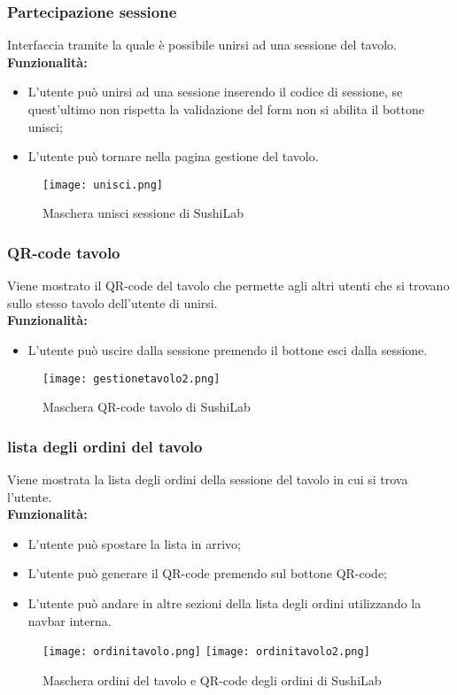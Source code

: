 \subsubsection{Partecipazione sessione}
Interfaccia tramite la quale è possibile unirsi ad una sessione del tavolo.\\
\textbf{Funzionalità:}
\begin{itemize}
    \item L'utente può unirsi ad una sessione inserendo il codice di sessione, se quest'ultimo non rispetta la validazione del form non si abilita il bottone unisci;
    \item L'utente può tornare nella pagina gestione del tavolo.
\end{itemize}
\begin{figure}[H]
    \centering
    \texttt{[image: unisci.png]}
    \caption{Maschera unisci sessione di SushiLab}
\end{figure}
\pagebreak

\subsubsection{QR-code tavolo}
Viene mostrato il QR-code del tavolo che permette agli altri utenti che si trovano sullo stesso tavolo dell'utente di unirsi.\\
\textbf{Funzionalità:}
\begin{itemize}
    \item L'utente può uscire dalla sessione premendo il bottone esci dalla sessione.
\end{itemize}
\begin{figure}[H]
    \centering
    \texttt{[image: gestionetavolo2.png]}
    \caption{Maschera QR-code tavolo di SushiLab}
\end{figure}
\pagebreak

\subsubsection{lista degli ordini del tavolo}
Viene mostrata la lista degli ordini della sessione del tavolo in cui si trova l'utente.\\
\textbf{Funzionalità:}
\begin{itemize}
    \item L'utente può spostare la lista in arrivo;
    \item L'utente può generare il QR-code premendo sul bottone QR-code;
    \item L'utente può andare in altre sezioni della lista degli ordini utilizzando la navbar interna.
\end{itemize}
\begin{figure}[H]
    \centering
    \texttt{[image: ordinitavolo.png]}
    \texttt{[image: ordinitavolo2.png]}
    \caption{Maschera ordini del tavolo e QR-code degli ordini di SushiLab}
\end{figure}
\pagebreak

